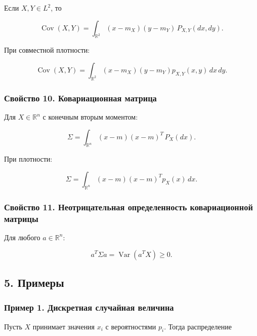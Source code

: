 \documentclass[
  11pt,
  a4paper,
]{article}
\begin{document}
Если \(X,Y\in L^2\), то

\[
\operatorname{Cov}(X,Y)
=
\int_{\mathbb R^2}(x-m_X)(y-m_Y)\,P_{X,Y}(dx,dy).
\]

При совместной плотности:

\[
\operatorname{Cov}(X,Y)
=
\int_{\mathbb R^2}(x-m_X)(y-m_Y)p_{X,Y}(x,y)\,dx\,dy.
\]

\subsubsection{Свойство 10. Ковариационная
матрица}\label{ux441ux432ux43eux439ux441ux442ux432ux43e-10.-ux43aux43eux432ux430ux440ux438ux430ux446ux438ux43eux43dux43dux430ux44f-ux43cux430ux442ux440ux438ux446ux430}

Для \(X\in\mathbb R^n\) с конечным вторым моментом:

\[
\Sigma=\int_{\mathbb R^n}(x-m)(x-m)^T\,P_X(dx).
\]

При плотности:

\[
\Sigma=\int_{\mathbb R^n}(x-m)(x-m)^T p_X(x)\,dx.
\]

\subsubsection{Свойство 11. Неотрицательная определенность
ковариационной
матрицы}\label{ux441ux432ux43eux439ux441ux442ux432ux43e-11.-ux43dux435ux43eux442ux440ux438ux446ux430ux442ux435ux43bux44cux43dux430ux44f-ux43eux43fux440ux435ux434ux435ux43bux435ux43dux43dux43eux441ux442ux44c-ux43aux43eux432ux430ux440ux438ux430ux446ux438ux43eux43dux43dux43eux439-ux43cux430ux442ux440ux438ux446ux44b}

Для любого \(a\in\mathbb R^n\):

\[
a^T\Sigma a=\operatorname{Var}(a^TX)\ge0.
\]

\subsection{5. Примеры}\label{ux43fux440ux438ux43cux435ux440ux44b}

\subsubsection{Пример 1. Дискретная случайная
величина}\label{ux43fux440ux438ux43cux435ux440-1.-ux434ux438ux441ux43aux440ux435ux442ux43dux430ux44f-ux441ux43bux443ux447ux430ux439ux43dux430ux44f-ux432ux435ux43bux438ux447ux438ux43dux430}

Пусть \(X\) принимает значения \(x_i\) с вероятностями \(p_i\). Тогда
распределение
\end{document}
